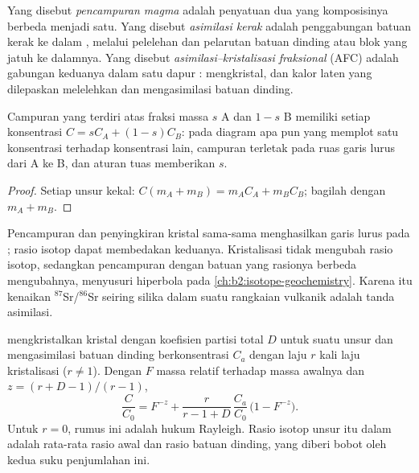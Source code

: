 \begin{definition}
\label{def:b2:magmatic-differentiation:open}
Yang disebut \emph{pencampuran magma} adalah penyatuan dua  yang
komposisinya berbeda menjadi satu. Yang disebut \emph{asimilasi kerak} adalah
penggabungan batuan kerak ke dalam , melalui pelelehan dan pelarutan batuan
dinding atau blok yang jatuh ke dalamnya. Yang disebut \emph{asimilasi--kristalisasi
fraksional} (AFC) adalah gabungan
keduanya dalam satu dapur :  mengkristal, dan kalor laten yang dilepaskan
melelehkan dan mengasimilasi batuan dinding.
\end{definition}

\begin{proposition}\label{prop:b2:magmatic-differentiation:mixing}
Campuran yang terdiri atas fraksi massa $s$  A dan $1-s$  B memiliki setiap
konsentrasi $C = sC_A + (1-s)C_B$: pada diagram apa pun yang memplot satu konsentrasi terhadap
konsentrasi lain, campuran terletak pada ruas garis lurus dari A ke B, dan aturan tuas memberikan
$s$.
\end{proposition}

\begin{proof}
Setiap unsur kekal: $C(m_A + m_B) = m_AC_A + m_BC_B$; bagilah dengan $m_A + m_B$.
\end{proof}

Pencampuran dan penyingkiran kristal sama-sama menghasilkan garis lurus pada ; rasio
isotop dapat membedakan keduanya. Kristalisasi tidak mengubah rasio isotop, sedangkan
pencampuran dengan batuan yang rasionya berbeda mengubahnya, menyusuri hiperbola pada
\cref{ch:b2:isotope-geochemistry}. Karena itu kenaikan $^{87}$Sr/$^{86}$Sr seiring silika dalam
suatu rangkaian vulkanik adalah tanda asimilasi.

\begin{proposition}
\label{prop:b2:magmatic-differentiation:afc}
 mengkristalkan kristal dengan koefisien partisi total $D$ untuk suatu unsur
dan mengasimilasi batuan dinding berkonsentrasi $C_a$ dengan laju $r$ kali laju
kristalisasi ($r \ne 1$). Dengan $F$ massa  relatif terhadap
massa awalnya dan $z = (r + D - 1)/(r - 1)$,
\[
\frac{C}{C_0} = F^{-z} + \frac{r}{r - 1 + D}\,\frac{C_a}{C_0}\,\bigl(1 - F^{-z}\bigr).
\]
Untuk $r = 0$, rumus ini adalah hukum Rayleigh. Rasio isotop unsur itu dalam 
adalah rata-rata rasio  awal dan rasio batuan dinding, yang diberi bobot oleh
kedua suku penjumlahan ini.
\end{proposition}

